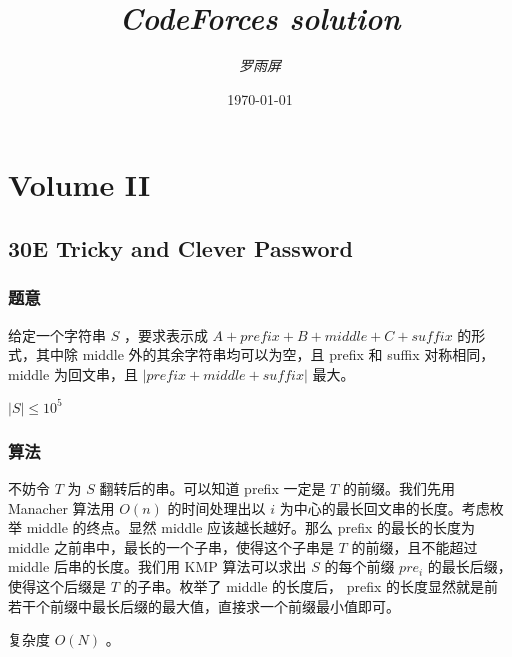 \documentclass[11pt]{article}
\title{\emph{CodeForces solution}}
\author{\emph{罗雨屏}}
\date{\today}
\begin{document}
\maketitle

\setcounter{tocdepth}{2}
\tableofcontents
\vspace*{1cm}

\newcommand{\abs}[1]{{\left\vert #1 \right\vert}}
\newcommand{\and}{\hspace{0.1cm} \textbf{and} \hspace{0.1cm}}
\newcommand{\or}{\hspace{0.1cm} \textbf{or} \hspace{0.1cm}}
\newcommand{\xor}{\hspace{0.1cm} \textbf{xor} \hspace{0.1cm}}
\newcommand{\floor}[ 1]{{\lfloor #1 \rfloor}}
\newcommand{\ceil}[ 1]{{\lceil #1 \rceil}}
\newtheorem{improve}{优化}
\newtheorem{theorem}{定理}
\newtheorem{proof}{证明}
\newtheorem{problem}{问题}
\newtheorem{definition}{定义}

\section{Volume II}
\label{sec-1}
\subsection{30E   Tricky and Clever Password}
\label{sec-1-1}
\subsubsection{题意}
\label{sec-1-1-1}

    给定一个字符串 $S$ ，要求表示成 $A + prefix + B + middle + C + suffix$ 的形式，其中除 middle 外的其余字符串均可以为空，且 prefix 和 suffix 对称相同， middle 为回文串，且 $\abs{prefix + middle + suffix}$ 最大。

    $\abs{S} \leq 10^5$
\subsubsection{算法}
\label{sec-1-1-2}

    不妨令 $T$ 为 $S$ 翻转后的串。可以知道 prefix 一定是 $T$ 的前缀。我们先用 Manacher 算法用 $O(n)$ 的时间处理出以 $i$ 为中心的最长回文串的长度。考虑枚举 middle 的终点。显然 middle 应该越长越好。那么 prefix 的最长的长度为 middle 之前串中，最长的一个子串，使得这个子串是 $T$ 的前缀，且不能超过 middle 后串的长度。我们用 KMP 算法可以求出 $S$ 的每个前缀 $pre_i$ 的最长后缀，使得这个后缀是 $T$ 的子串。枚举了 middle 的长度后， prefix 的长度显然就是前若干个前缀中最长后缀的最大值，直接求一个前缀最小值即可。

    复杂度 $O(N)$ 。
\end{document}
